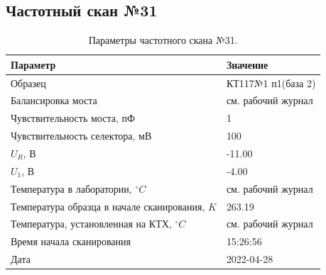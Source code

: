 \subsection{Частотный скан №31}
\begin{table}[!ht]
    \centering
    \caption{Параметры частотного скана №31.}
    \begin{tabular}{|l|l|}
        \hline
        Параметр                                       & Значение                  \\ \hline
        Образец                                        & КТ117№1 п1(база 2)        \\ \hline
        Балансировка моста                             & см. рабочий журнал        \\ \hline
        Чувствительность моста, пФ                     & 1                         \\ \hline
        Чувствительность селектора, мВ                 & 100                       \\ \hline
        $U_R$, В                                       & -11.00                    \\ \hline
        $U_1$, В                                       & -4.00                     \\ \hline
        Температура в лаборатории, $^\circ C$          & см. рабочий журнал        \\ \hline
        Температура образца в начале сканирования, $K$ & 263.19                    \\ \hline
        Температура, установленная на КТХ, $^\circ C$  & см. рабочий журнал        \\ \hline
        Время начала сканирования                      & 15:26:56                  \\ \hline
        Дата                                           & 2022-04-28                \\ \hline
    \end{tabular}
    \label{table:frequency_scan_31}
\end{table}

